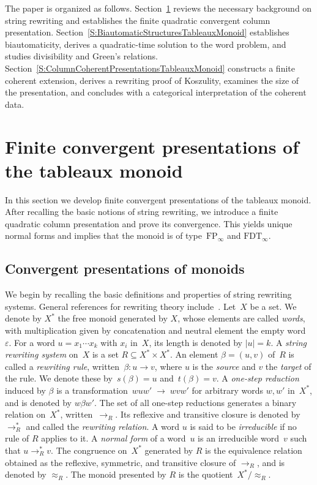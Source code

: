 \documentclass[a4paper, twoside, 11pt, english]{article}
\theoremstyle{plain}
\theoremstyle{definition}
\newcommand{\fl}{\rightarrow}
\begin{document}
The paper is organized as follows. Section~\ref{S:ColumnPresentationsTableauxMonoid} reviews the necessary background on string rewriting and establishes the finite quadratic convergent column presentation. 
Section~\ref{S:BiautomaticStructuresTableauxMonoid} establishes biautomaticity, derives a quadratic-time solution to the word problem, and studies divisibility and Green's relations. Section~\ref{S:ColumnCoherentPresentationsTableauxMonoid} constructs a finite coherent extension, derives a rewriting proof of Koszulity, examines the size of the presentation, and concludes with a categorical interpretation of the coherent data.




\section{Finite convergent presentations of the tableaux monoid}
\label{S:ColumnPresentationsTableauxMonoid}

In this section we develop finite convergent presentations of the tableaux monoid.
After recalling the basic notions of string rewriting, we introduce a finite
quadratic column presentation and prove its convergence.
This yields unique normal forms and implies that the monoid is of type~$\mathrm{FP}_\infty$ and $\mathrm{FDT}_\infty$.

\subsection{Convergent presentations of monoids}
\label{SS:ConvergentPresentations}
We begin by recalling the basic definitions and properties of string rewriting systems.
General references for rewriting theory include~\cite{BookOtto93}. 
Let~$X$ be a set.
We denote by $X^\ast$ the free monoid generated by $X$, whose elements are called \emph{words},
with multiplication given by concatenation and neutral element the empty word~$\varepsilon$.
For a word $u = x_1 \cdots x_k$ with $x_i$ in~$X$, its length is denoted by $|u| = k$.
A \emph{string rewriting system} on~$X$ is a set $R \subseteq X^\ast \times X^\ast$.
An element $\beta = (u,v)$ of~$R$ is called a \emph{rewriting rule}, written~$\beta : u \fl v$,
where $u$ is the \emph{source} and $v$ the \emph{target} of the rule.
We denote these by~$s(\beta)=u$ and~$t(\beta)=v$.
A \emph{one-step reduction} induced by $\beta$ is a transformation~$wuw' \;\fl\; wvw'$
for arbitrary words $w,w'$  in~$X^\ast$, and is denoted by $w\beta w'$.
The set of all one-step reductions generates a binary relation on~$X^\ast$, written~$\fl_R$.
Its reflexive and transitive closure is denoted by~$\fl_R^\ast$ and called the \emph{rewriting relation}.
A word $u$ is said to be \emph{irreducible} if no rule of $R$ applies to it.
A \emph{normal form} of a word~$u$ is an irreducible word~$v$ such that $u \fl_R^\ast v$. 
The congruence on~$X^\ast$ generated by $R$ is the equivalence relation
obtained as the reflexive, symmetric, and transitive closure of $\fl_R$,
and is denoted by $\approx_R$.
The monoid presented by $R$ is the quotient~$X^\ast / \!\approx_R$.
\end{document}
